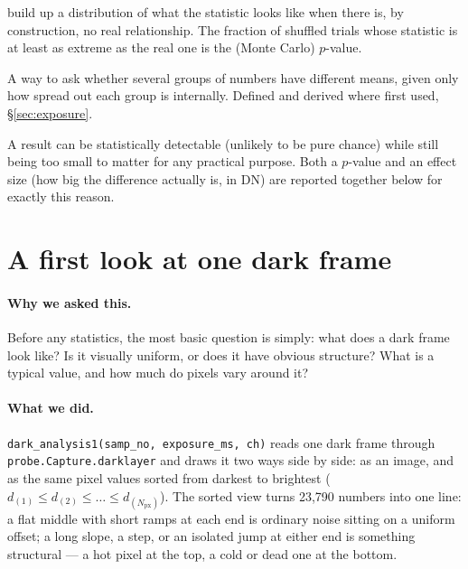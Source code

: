 \documentclass[11pt,a4paper]{article}
\newcommand{\code}[1]{\texttt{#1}}
\begin{document}
\begin{description}[leftmargin=2.2cm,style=nextline]
  build up a distribution of what the statistic looks like when there is,
  by construction, no real relationship. The fraction of shuffled trials
  whose statistic is at least as extreme as the real one is the
  (Monte Carlo) $p$-value.
\item[One-way ANOVA and the $F$-statistic] A way to ask whether several
  groups of numbers have different means, given only how spread out each
  group is internally. Defined and derived where first used,
  \S\ref{sec:exposure}.
\item[Statistical vs.\ practical significance] A result can be
  statistically detectable (unlikely to be pure chance) while still being
  too small to matter for any practical purpose. Both a $p$-value and an
  effect size (how big the difference actually is, in DN) are reported
  together below for exactly this reason.
\end{description}

\section{A first look at one dark frame}
\label{sec:first-look}

\paragraph{Why we asked this.}
Before any statistics, the most basic question is simply: what does a dark
frame look like? Is it visually uniform, or does it have obvious structure?
What is a typical value, and how much do pixels vary around it?

\paragraph{What we did.}
\code{dark\_analysis1(samp\_no, exposure\_ms, ch)} reads one dark frame
through \code{probe.Capture.darklayer} and draws it two ways side by side:
as an image, and as the same pixel values sorted from darkest to brightest
($d_{(1)} \le d_{(2)} \le \dots \le d_{(N_{\mathrm{px}})}$). The sorted view
turns 23{,}790 numbers into one line: a flat middle with short ramps at
each end is ordinary noise sitting on a uniform offset; a long slope, a
step, or an isolated jump at either end is something structural --- a hot
pixel at the top, a cold or dead one at the bottom.
\end{document}
